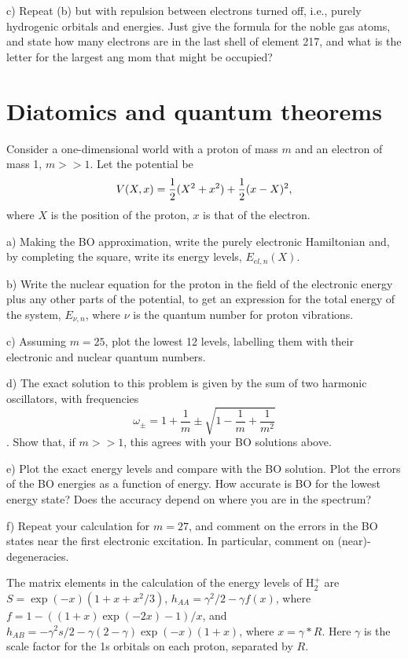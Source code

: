 c) Repeat (b) but with repulsion between electrons turned off, i.e.,
purely hydrogenic orbitals and energies.  Just give the formula for the
noble gas atoms, and state how many electrons are in the last shell
of element 217, and what is the letter for the largest ang mom that
might be occupied?


\newpage

\part{Diatomics and quantum theorems}
\newpage
{}

Consider a one-dimensional world with a proton of mass $m$ and an electron of mass 1, $m >> 1$.
Let the potential be
$$V(X,x)= \frac{1}{2} (X^2+x^2) + \frac{1}{2} (x-X)^2, $$
where $X$ is the position of the proton, $x$ is that of the electron.

a) Making the BO approximation, write the purely electronic Hamiltonian and, by completing the
square, write its energy levels, $E_{el,n}(X)$.

b) Write the nuclear equation for the proton in the field of the electronic energy plus any other
parts of the potential,
to get an expression for the total energy of the system, $E_{\nu,n}$, where $\nu$ is
the quantum number for proton vibrations.

c) Assuming $m=25$, plot the lowest 12 levels, labelling them with their electronic 
and nuclear quantum numbers.

d) The exact solution to this problem is given by the sum of two harmonic oscillators, with frequencies
$$\omega_\pm = 1 +\frac{1}{m} \pm {\sqrt{1-\frac{1}{m}+\frac{1}{m^2}}}$$.
Show that, if $m>>1$, this agrees with your BO solutions above.

e) Plot the exact energy levels and compare with the BO solution. Plot the errors
of the BO energies as a function of energy.  How accurate is BO for the lowest
energy state?  Does the accuracy depend on where you are in the spectrum?

f) Repeat your calculation for $m=27$, and comment on the errors in the BO states near
the first electronic excitation.  In particular, comment on  (near)-degeneracies.

\newpage
{}

The matrix elements in the calculation of the energy levels of H$_2^+$ are $S= \exp(-x)(1+x+x^2/3)$,
$h_{AA}=\gamma^2/2-\gamma f(x)$, where $f=1-((1+x)\exp(-2 x)-1)/x$, and
$h_{AB}=-\gamma^2 s/2-\gamma (2-\gamma) \exp(-x)(1+x)$, where $x=\gamma*R$.
Here $\gamma$ is the scale factor for the 1s orbitals on each proton, separated by $R$.

